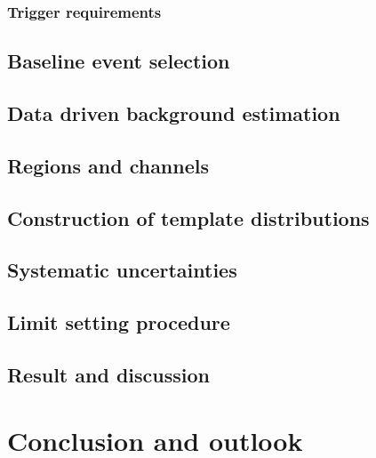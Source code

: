 \subsection{Trigger requirements}
\section{Baseline event selection}
\section{Data driven background estimation}
\section{Regions and channels}
\section{Construction of template distributions}
\section{Systematic uncertainties}

\section{Limit setting procedure}
\section{Result and discussion}
\chapter{Conclusion and outlook}
\label{s:showcase}
%



\backmatter

\hypersetup{urlcolor=darkgreen}
\printbibliography  %
\hypersetup{urlcolor=darkblue}


